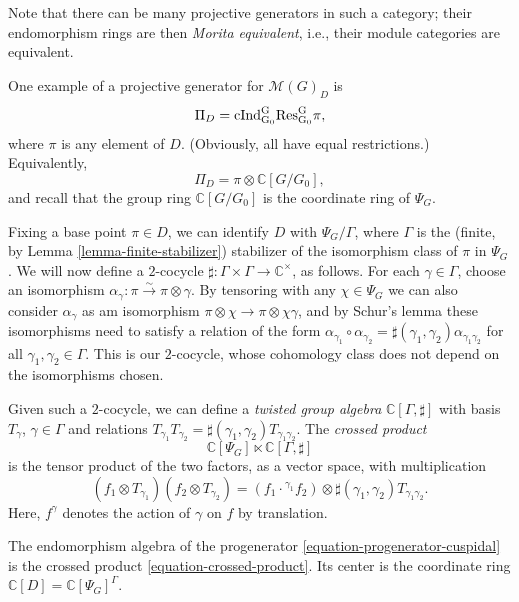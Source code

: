 Note that there can be many projective generators in such a category; their endomorphism rings are then {\it Morita equivalent}, i.e., their module categories are equivalent. 

One example of a projective generator for $\mathcal M(G)_D$ is 
\begin{equation}
	\label{equation-progenerator-cuspidal}	
	\Pi_D= \rm{cInd}_{G_0}^G \rm{Res}_{G_0}^G \pi,
\end{equation}
where $\pi$ is any element of $D$. (Obviously, all have equal restrictions.) Equivalently,
\[\Pi_D = \pi\otimes \mathbb C[G/G_0],\]
and recall that the group ring $\mathbb C[G/G_0]$ is the coordinate ring of $\Psi_G$. 

Fixing a base point $\pi\in D$, we can identify $D$ with $\Psi_G/\Gamma$, where $\Gamma$ is the (finite, by Lemma \ref{lemma-finite-stabilizer}) stabilizer of the isomorphism class of $\pi$ in $\Psi_G$. We will now define a $2$-cocycle $\sharp:\Gamma \times \Gamma\to \mathbb C^\times$, as follows. For each $\gamma\in\Gamma$, choose an isomorphism $\alpha_\gamma: \pi\xrightarrow\sim \pi\otimes\gamma$. By tensoring with any $\chi\in \Psi_G$ we can also consider $\alpha_\gamma$ as am isomorphism $\pi\otimes\chi\to \pi\otimes\chi\gamma$, and by Schur's lemma these isomorphisms need to satisfy a relation of the form $\alpha_{\gamma_1}\circ \alpha_{\gamma_2} = \sharp(\gamma_1,\gamma_2) \alpha_{\gamma_1\gamma_2}$ for all $\gamma_1, \gamma_2 \in \Gamma$. This is our $2$-cocycle, whose cohomology class does not depend on the isomorphisms chosen.

Given such a $2$-cocycle, we can define a {\it twisted group algebra} $\mathbb C[\Gamma, \sharp]$ with basis $T_\gamma$, $\gamma\in \Gamma$ and relations $T_{\gamma_1}T_{\gamma_2} = \sharp(\gamma_1,\gamma_2) T_{\gamma_1\gamma_2}$. The {\it crossed product}
\begin{equation}
	\label{equation-crossed-product}
\mathbb C[\Psi_G]\ltimes \mathbb C[\Gamma,\sharp]
\end{equation}
is the tensor product of the two factors, as a vector space, with multiplication
$$ (f_1\otimes T_{\gamma_1})(f_2\otimes T_{\gamma_2}) = (f_1 \cdot {^{\gamma_1}f_2})\otimes \sharp(\gamma_1,\gamma_2) T_{\gamma_1\gamma_2}.$$
Here, $f^\gamma$ denotes the action of $\gamma$ on $f$ by translation. 

\begin{proposition}
	\label{proposition-endomorphism-cuspidal}
The endomorphism algebra of the progenerator \eqref{equation-progenerator-cuspidal} is the crossed product \eqref{equation-crossed-product}. Its center is the coordinate ring $\mathbb C[D] = \mathbb C[\Psi_G]^\Gamma$.
\end{proposition}

